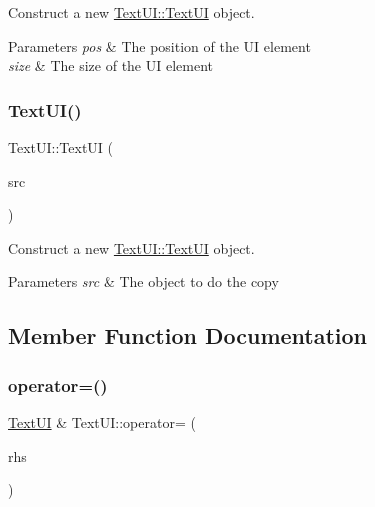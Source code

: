 Construct a new \hyperlink{class_text_u_i_ac985cfaf70bceed7f26d1f184836e523}{Text\+U\+I\+::\+Text\+UI} object. 


\begin{DoxyParams}{Parameters}
{\em pos} & The position of the UI element \\
\hline
{\em size} & The size of the UI element \\
\hline
\end{DoxyParams}
\mbox{\label{class_text_u_i_ab960011cbb3e815bf698640def9974bd}} 
\subsubsection{\texorpdfstring{Text\+U\+I()}{TextUI()}\hspace{0.1cm}{\footnotesize\ttfamily [2/2]}}
{\footnotesize\ttfamily Text\+U\+I\+::\+Text\+UI (\begin{DoxyParamCaption}\item[{\hyperlink{class_text_u_i}{Text\+UI} const \&}]{src }\end{DoxyParamCaption})}



Construct a new \hyperlink{class_text_u_i_ac985cfaf70bceed7f26d1f184836e523}{Text\+U\+I\+::\+Text\+UI} object. 


\begin{DoxyParams}{Parameters}
{\em src} & The object to do the copy \\
\hline
\end{DoxyParams}


\subsection{Member Function Documentation}
\mbox{\label{class_text_u_i_a9e461e80a257b84e3739e38364de1dd1}} 
\subsubsection{\texorpdfstring{operator=()}{operator=()}}
{\footnotesize\ttfamily \hyperlink{class_text_u_i}{Text\+UI} \& Text\+U\+I\+::operator= (\begin{DoxyParamCaption}\item[{\hyperlink{class_text_u_i}{Text\+UI} const \&}]{rhs }\end{DoxyParamCaption})}




